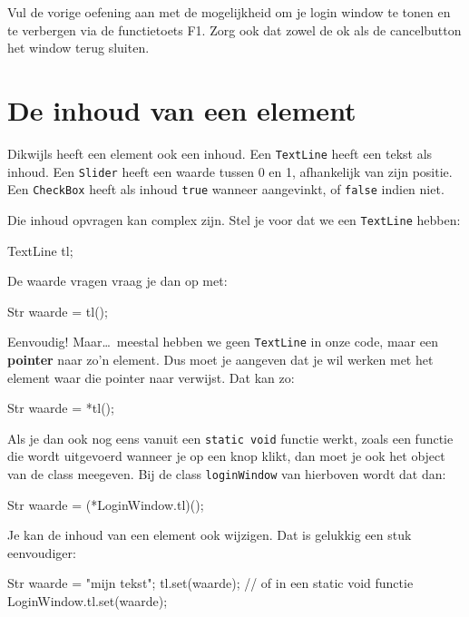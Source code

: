 \begin{exercise}
Vul de vorige oefening aan met de mogelijkheid om je login window te tonen en te verbergen via de functietoets F1. Zorg ook dat zowel de ok als de cancelbutton het window terug sluiten.
\end{exercise}

\section{De inhoud van een element}
\label{chapter:gui_content}
Dikwijls heeft een element ook een inhoud. Een \texttt{TextLine} heeft een tekst als inhoud. Een \texttt{Slider} heeft een waarde tussen 0 en 1, afhankelijk van zijn positie. Een \texttt{CheckBox} heeft als inhoud \texttt{true} wanneer aangevinkt, of \texttt{false} indien niet. 

Die inhoud opvragen kan complex zijn. Stel je voor dat we een \texttt{TextLine} hebben:

\begin{code}
TextLine tl;
\end{code}

De waarde vragen vraag je dan op met:

\begin{code}
Str waarde = tl();
\end{code}

Eenvoudig! Maar\ldots\ meestal hebben we geen \texttt{TextLine} in onze code, maar een \textbf{pointer} naar zo'n element. Dus moet je aangeven dat je wil werken met het element waar die pointer naar verwijst. Dat kan zo:

\begin{code}
Str waarde = *tl();
\end{code}

Als je dan ook nog eens vanuit een \texttt{static void} functie werkt, zoals een functie die wordt uitgevoerd wanneer je op een knop klikt, dan moet je ook het object van de class meegeven. Bij de class \texttt{loginWindow} van hierboven wordt dat dan:

\begin{code}
Str waarde = (*LoginWindow.tl)();
\end{code}

Je kan de inhoud van een element ook wijzigen. Dat is gelukkig een stuk eenvoudiger:

\begin{code}
Str waarde = "mijn tekst";
tl.set(waarde);
// of in een static void functie
LoginWindow.tl.set(waarde);
\end{code}

